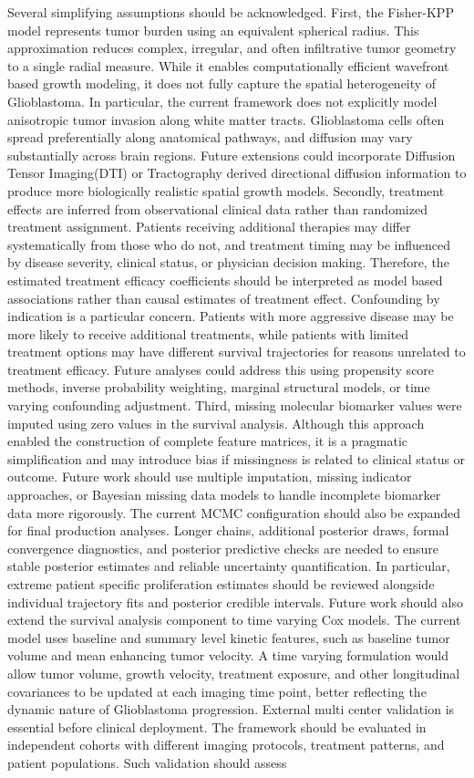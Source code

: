 Several simplifying assumptions should be acknowledged. First, the Fisher-KPP model represents tumor burden using an equivalent spherical radius. This approximation reduces complex, irregular, and often infiltrative tumor geometry to a single radial measure. While it enables computationally efficient wavefront based growth modeling, it does not fully capture the spatial heterogeneity of Glioblastoma. In particular, the current framework does not explicitly model anisotropic tumor invasion along white matter tracts. Glioblastoma cells often spread preferentially along anatomical pathways, and diffusion may vary substantially across brain regions. Future extensions could incorporate Diffusion Tensor Imaging(DTI) or Tractography derived directional diffusion information to produce more biologically realistic spatial growth models. Secondly, treatment effects are inferred from observational clinical data rather than randomized treatment assignment. Patients receiving additional therapies may differ systematically from those who do not, and treatment timing may be influenced by disease severity, clinical status, or physician decision making. Therefore, the estimated treatment efficacy coefficients should be interpreted as model based associations rather than causal estimates of treatment effect. Confounding by indication is a particular concern. Patients with more aggressive disease may be more likely to receive additional treatments, while patients with limited treatment options may have different survival trajectories for reasons unrelated to treatment efficacy. Future analyses could address this using propensity score methods, inverse probability weighting, marginal structural models, or time varying confounding adjustment. Third, missing molecular biomarker values were imputed using zero values in the survival analysis. Although this approach enabled the construction of complete feature matrices, it is a pragmatic simplification and may introduce bias if missingness is related to clinical status or outcome. Future work should use multiple imputation, missing indicator approaches, or Bayesian missing data models to handle incomplete biomarker data more rigorously. The current MCMC configuration should also be expanded for final production analyses. Longer chains, additional posterior draws, formal convergence diagnostics, and posterior predictive checks are needed to ensure stable posterior estimates and reliable uncertainty quantification. In particular, extreme patient specific proliferation estimates should be reviewed alongside individual trajectory fits and posterior credible intervals. Future work should also extend the survival analysis component to time varying Cox models. The current model uses baseline and summary level kinetic features, such as baseline tumor volume and mean enhancing tumor velocity. A time varying formulation would allow tumor volume, growth velocity, treatment exposure, and other longitudinal covariances to be updated at each imaging time point, better reflecting the dynamic nature of Glioblastoma progression. External multi center validation is essential before clinical deployment. The framework should be evaluated in independent cohorts with different imaging protocols, treatment patterns, and patient populations. Such validation should assess 